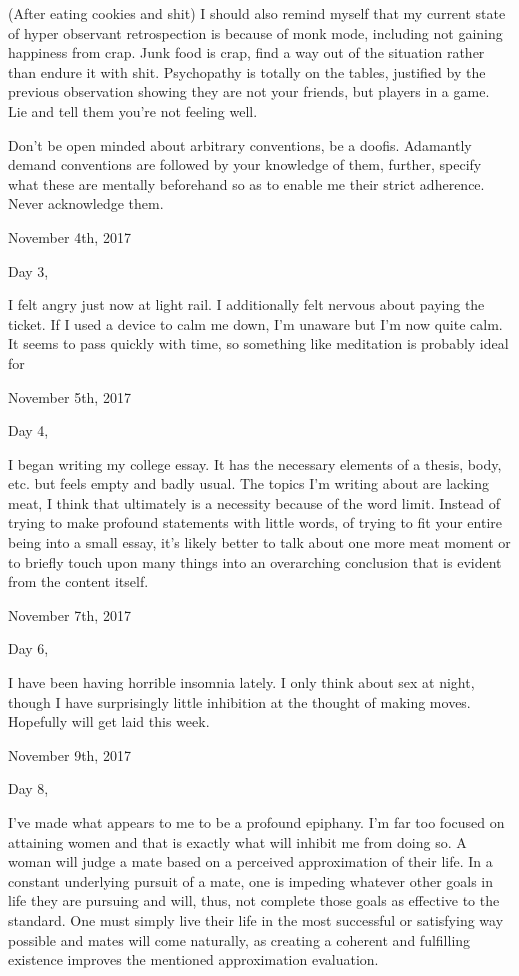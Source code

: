 (After eating cookies and shit) I should also remind myself that my
current state of hyper observant retrospection is because of monk mode,
including not gaining happiness from crap. Junk food is crap, find a way
out of the situation rather than endure it with shit. Psychopathy is
totally on the tables, justified by the previous observation showing
they are not your friends, but players in a game. Lie and tell them
you're not feeling well.

Don't be open minded about arbitrary conventions, be a doofis. Adamantly
demand conventions are followed by your knowledge of them, further,
specify what these are mentally beforehand so as to enable me their
strict adherence. Never acknowledge them.

\bigskip
\bigskip
November 4th, 2017

Day 3,

I felt angry just now at light rail. I additionally felt nervous about
paying the ticket. If I used a device to calm me down, I'm unaware but
I'm now quite calm. It seems to pass quickly with time, so something
like meditation is probably ideal for

\bigskip
\bigskip
November 5th, 2017

Day 4,

I began writing my college essay. It has the necessary elements of a
thesis, body, etc. but feels empty and badly usual. The topics I'm
writing about are lacking meat, I think that ultimately is a necessity
because of the word limit. Instead of trying to make profound statements
with little words, of trying to fit your entire being into a small
essay, it's likely better to talk about one more meat moment or to
briefly touch upon many things into an overarching conclusion that is
evident from the content itself.

\bigskip
\bigskip
November 7th, 2017

Day 6,

I have been having horrible insomnia lately. I only think about sex at
night, though I have surprisingly little inhibition at the thought of
making moves. Hopefully will get laid this week.

\bigskip
\bigskip
November 9th, 2017

Day 8,

I've made what appears to me to be a profound epiphany. I'm far too
focused on attaining women and that is exactly what will inhibit me from
doing so. A woman will judge a mate based on a perceived approximation
of their life. In a constant underlying pursuit of a mate, one is
impeding whatever other goals in life they are pursuing and will, thus,
not complete those goals as effective to the standard. One must simply
live their life in the most successful or satisfying way possible and
mates will come naturally, as creating a coherent and fulfilling
existence improves the mentioned approximation evaluation.

